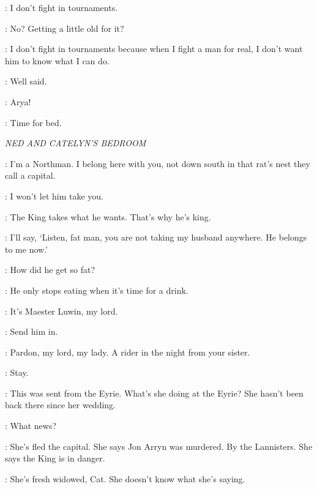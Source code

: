 \NED: I don't fight in tournaments. 

\JAIME: No? Getting a little old for it? 

\NED: I don't fight in tournaments because when I fight a man for real, I don't want him to know what I can do. 

\JAIME: Well said. 


\SANSA: Arya! 


\ROBB: Time for bed. 


\scene

\textit{NED AND CATELYN'S BEDROOM} 


\NED: I'm a Northman. I belong here with you, not down south in that rat's nest they call a capital. 

\CATELYN: I won't let him take you. 

\NED: The King takes what he wants. That's why he's king. 

\CATELYN: I'll say, `Listen, fat man, you are not taking my husband anywhere. He belongs to me now.' 

\NED: How did he get so fat? 

\CATELYN: He only stops eating when it's time for a drink. 


\SERVANT: It's Maester Luwin, my lord. 

\NED: Send him in. 

\LUWIN: Pardon, my lord, my lady. A rider in the night from your sister. 


\NED: Stay. 

\CATELYN: This was sent from the Eyrie. What's she doing at the Eyrie? She hasn't been back there since her wedding. 


\NED: What news? 

\CATELYN: She's fled the capital. She says Jon Arryn was murdered. By the Lannisters. She says the King is in danger. 

\NED: She's fresh widowed, Cat. She doesn't know what she's saying. 

